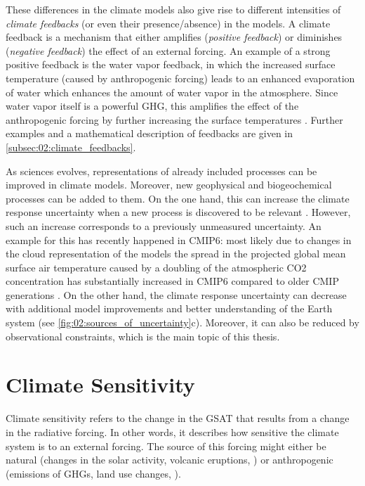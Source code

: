 These differences in the climate models also give rise to different intensities
of \emph{climate feedbacks} (or even their presence/absence) in the models. A
climate feedback is a mechanism that either amplifies (\emph{positive
  feedback}) or diminishes (\emph{negative feedback}) the effect of an external
forcing. An example of a strong positive feedback is the water vapor feedback,
in which the increased surface temperature (caused by anthropogenic forcing)
leads to an enhanced evaporation of water which enhances the amount of water
vapor in the atmosphere. Since water vapor itself is a powerful \ac{GHG}, this
amplifies the effect of the anthropogenic forcing by further increasing the
surface temperatures \autocite{Cubasch2013}. Further examples and a
mathematical description of feedbacks are given in
\cref{subsec:02:climate_feedbacks}.

As sciences evolves, representations of already included processes can be
improved in climate models. Moreover, new geophysical and biogeochemical
processes can be added to them. On the one hand, this can increase the climate
response uncertainty when a new process is discovered to be relevant
. However,
such an increase corresponds to a previously unmeasured uncertainty. An example
for this has recently happened in \acs{CMIP}6: most likely due to changes in
the cloud representation of the models the spread in the projected global mean
surface air temperature caused by a doubling of the atmospheric \ac{CO2}
concentration has substantially increased in \ac{CMIP}6 compared to older
\ac{CMIP} generations \autocite{Zelinka2020}. On the other hand, the climate
response uncertainty can decrease with additional model improvements and better
understanding of the Earth system (see \cref{fig:02:sources_of_uncertainty}c).
Moreover, it can also be reduced by observational constraints, which is the
main topic of this thesis.


\section{Climate Sensitivity}
\label{sec:02:climate_sensitivity}

Climate sensitivity refers to the change in the \ac{GSAT} that results from a
change in the radiative forcing. In other words, it describes how sensitive the
climate system is to an external forcing. The source of this forcing might
either be natural (changes in the solar activity, volcanic eruptions, \etc{})
or anthropogenic (emissions of \acp{GHG}, land use changes, \etc{}).


